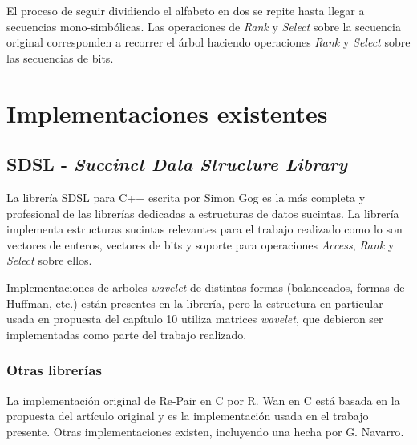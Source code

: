 El proceso de seguir dividiendo el alfabeto en dos se repite hasta llegar a secuencias mono-simbólicas. Las operaciones de \textit{Rank} y \textit{Select} sobre la secuencia original corresponden a recorrer el árbol haciendo operaciones \textit{Rank} y \textit{Select }sobre las secuencias de bits.


\section{Implementaciones existentes}

\subsection{SDSL - \textit{Succinct Data Structure Library}}

La librería SDSL para C++ escrita por Simon Gog\cite{gbmp2014sea} es la más completa y profesional de las librerías dedicadas a estructuras de datos sucintas. La librería implementa estructuras sucintas relevantes para el trabajo realizado como lo son vectores de enteros, vectores de bits y soporte para operaciones \textit{Access}, \textit{Rank} y \textit{Select} sobre ellos.

Implementaciones de arboles \textit{wavelet} de distintas formas (balanceados, formas de Huffman, etc.) están presentes en la librería, pero la estructura en particular usada en propuesta del capítulo 10\cite{Navarro} utiliza matrices \textit{wavelet}, que debieron ser implementadas como parte del trabajo realizado.

\subsubsection{Otras librerías}
La implementación original de Re-Pair en C\cite{re-pair} por R. Wan en C está basada en la propuesta del artículo original\cite{Larsson2000} y es la implementación usada en el trabajo presente. Otras implementaciones existen, incluyendo una hecha por G. Navarro\cite{re-pair-navarro}. 
